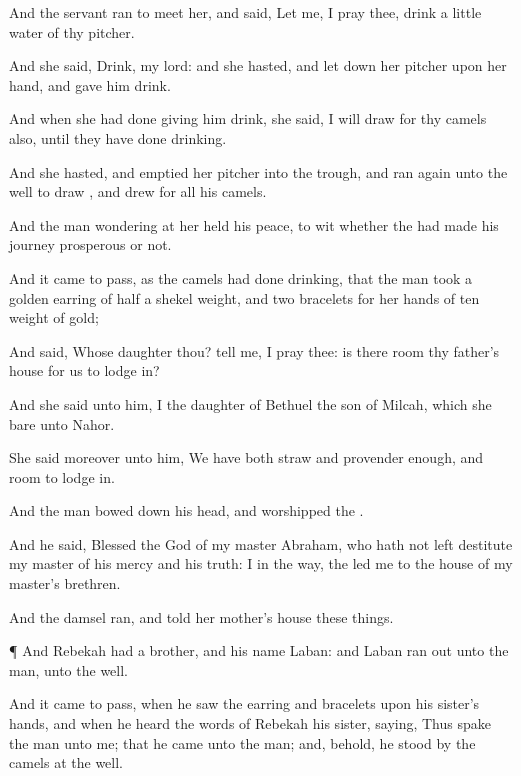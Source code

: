 {And the
servant
ran to meet
her, and
said, Let me, I pray thee,
drink a
little
water of thy
pitcher.

And she
said,
Drink, my
lord: and she
hasted, and let
down her
pitcher upon her
hand, and gave him
drink.

And when she had
done giving him
drink, she
said, I will
draw
{} for thy
camels also, until they have
done
drinking.

And she
hasted, and
emptied her
pitcher into the
trough, and
ran again unto the
well to
draw
{}, and
drew for all his
camels.

And the
man
wondering at her held his
peace, to
wit whether the
{} had
made his
journey
prosperous
or not.

And it came to pass, as the
camels had
done
drinking, that the
man
took a
golden
earring of half a
shekel
weight, and
two
bracelets for her
hands of
ten
{}
weight of
gold;

And
said,
Whose
daughter
{}
thou?
tell me, I pray thee: is
there
room
{} thy
father’s
house for us to lodge
in?

And she
said unto him, I
{} the
daughter of
Bethuel the
son of
Milcah, which she
bare unto
Nahor.

She
said moreover unto him, We have
both
straw and
provender
enough,
and
room to lodge
in.

And the
man bowed down his
head, and
worshipped the
{}.

And he
said,
Blessed
{} the
{}
God of my
master
Abraham, who hath not left
destitute my
master of his
mercy and his
truth: I
{} in the
way, the
{} led
me to the
house of my
master’s
brethren.

And the
damsel
ran, and
told
{} her
mother’s
house these
things.


\par }{\PP {}¶ And
Rebekah had a
brother, and his
name
{}
Laban: and
Laban
ran
out unto the
man, unto the
well.

And it came to pass, when he
saw the
earring and
bracelets upon his
sister’s
hands, and when he
heard the
words of
Rebekah his
sister,
saying,
Thus
spake the
man unto me; that he
came unto the
man; and, behold, he
stood
by the
camels at the
well.

}

